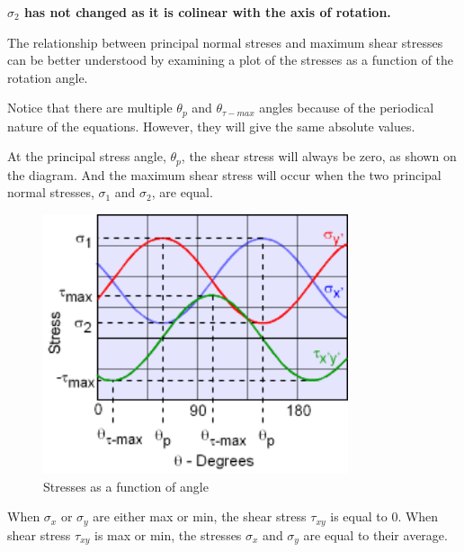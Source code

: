 \begin{itemize}
        \textbf{$\sigma_2$ has not changed as it is colinear with the axis of rotation.}

        The relationship between principal normal streses and maximum shear stresses
        can be better understood by examining a plot of the stresses as a function
        of the rotation angle.

        Notice that there are multiple $\theta_{p}$ and $\theta_{\tau - max}$
        angles because of the periodical nature of the equations. However, they
        will give the same absolute values.

        At the principal stress angle, $\theta_{p}$, the shear stress will always be zero,
        as shown on the diagram. And the maximum shear stress will occur when the
        two principal normal stresses, $\sigma_1$ and $\sigma_2$, are equal.

        \begin{figure}[ht]
            \centering
            \includegraphics[width=0.8\textwidth]{img/stresses_as_function_of_angle}
            \caption{Stresses as a function of angle}
            \label{fig:stresses_as_function_of_angle-png}
        \end{figure}

        \begin{bbox}[0.85]
            When $\sigma_{x}$ or $\sigma_{y}$ are either max or min, the shear stress
            $\tau_{xy}$ is equal to 0. When shear stress $\tau_{xy}$ is max or min,
            the stresses $\sigma_{x}$ and $\sigma_{y}$ are equal to their average.
        \end{bbox}


\end{itemize}


